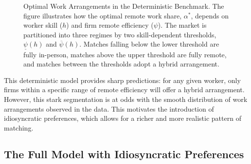 \documentclass[
  11pt,
  letterpaper,
  DIV=11,
  numbers=noendperiod]{scrartcl}
\begin{document}
\begin{figure}


\caption{\label{fig-deterministic-thresholds}Optimal Work Arrangements
in the Deterministic Benchmark. The figure illustrates how the optimal
remote work share, \(\alpha^*\), depends on worker skill (\(h\)) and
firm remote efficiency (\(\psi\)). The market is partitioned into three
regimes by two skill-dependent thresholds, \(\underline{\psi}(h)\) and
\(\overline{\psi}(h)\). Matches falling below the lower threshold are
fully in-person, matches above the upper threshold are fully remote, and
matches between the thresholds adopt a hybrid arrangement.}

\end{figure}%

This deterministic model provides sharp predictions: for any given
worker, only firms within a specific range of remote efficiency will
offer a hybrid arrangement. However, this stark segmentation is at odds
with the smooth distribution of work arrangements observed in the data.
This motivates the introduction of idiosyncratic preferences, which
allows for a richer and more realistic pattern of matching.

\subsection{The Full Model with Idiosyncratic
Preferences}\label{the-full-model-with-idiosyncratic-preferences}
\end{document}
